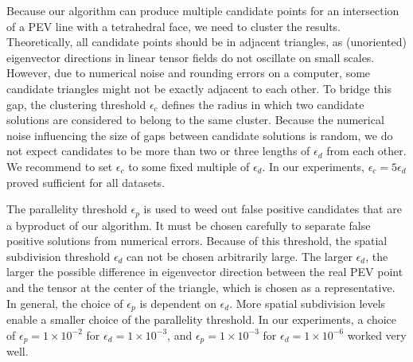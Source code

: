 %
Because our algorithm can produce multiple candidate points for an intersection
of a \ac{PEV} line with a tetrahedral face, we need to cluster the results.
%
Theoretically, all candidate points should be in adjacent triangles, as
(unoriented) eigenvector directions in linear tensor fields do not oscillate
on small scales.
%
However, due to numerical noise and rounding errors on a computer, some
candidate triangles might not be exactly adjacent to each other.
%
To bridge this gap, the clustering threshold $\epsilon_c$ defines the radius in
which two candidate solutions are considered to belong to the same cluster.
%
Because the numerical noise influencing the size of gaps between candidate
solutions is random, we do not expect candidates to be more than two or three
lengths of $\epsilon_d$ from each other.
%
We recommend to set $\epsilon_c$ to some fixed multiple of $\epsilon_d$.
%
In our experiments, $\epsilon_c = 5 \epsilon_d$ proved sufficient for all
datasets.
%

%
The parallelity threshold $\epsilon_p$ is used to weed out false positive
candidates that are a byproduct of our algorithm.
%
It must be chosen carefully to separate false positive solutions from numerical
errors.
%
Because of this threshold, the spatial subdivision threshold $\epsilon_d$ can
not be chosen arbitrarily large.
%
The larger $\epsilon_d$, the larger the possible difference in eigenvector
direction between the real \ac{PEV} point and the tensor at the center of the
triangle, which is chosen as a representative.
%
In general, the choice of $\epsilon_p$ is dependent on $\epsilon_d$.
%
More spatial subdivision levels enable a smaller choice of the parallelity
threshold.
%
In our experiments, a choice of $\epsilon_p = 1 \times 10^{-2}$ for
$\epsilon_d = 1 \times 10^{-3}$, and $\epsilon_p = 1 \times 10^{-3}$ for
$\epsilon_d = 1 \times 10^{-6}$ worked very well.
%